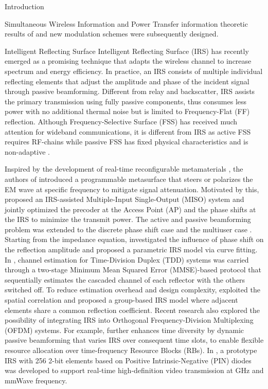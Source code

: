 \documentclass[journal]{IEEEtran}
\begin{document}
\begin{section}{Introduction}
\begin{subsection}{Simultaneous Wireless Information and Power Transfer}
information theoretic results of \cite{Varasteh2020} and new modulation schemes were subsequently designed.
		\end{subsection}


		\begin{subsection}{Intelligent Reflecting Surface}
			Intelligent Reflecting Surface (IRS) has recently emerged as a promising technique that adapts the wireless channel to increase spectrum and energy efficiency. In practice, an IRS consists of multiple individual reflecting elements that adjust the amplitude and phase of the incident signal through passive beamforming. Different from relay and backscatter, IRS assists the primary transmission using fully passive components, thus consumes less power with no additional thermal noise but is limited to Frequency-Flat (FF) reflection. Although Frequency-Selective Surface (FSS) has received much attention for wideband communications, it is different from IRS as active FSS requires RF-chains \cite{Kim2006} while passive FSS has fixed physical characteristics and is non-adaptive \cite{Anwar2018}.

			Inspired by the development of real-time reconfigurable metamaterials \cite{Cui2014}, the authors of \cite{Liaskos2018} introduced a programmable metasurface that steers or polarizes the EM wave at specific frequency to mitigate signal attenuation. Motivated by this, \cite{Wu2018} proposed an IRS-assisted Multiple-Input Single-Output (MISO) system and jointly optimized the precoder at the Access Point (AP) and the phase shifts at the IRS to minimize the transmit power. The active and passive beamforming problem was extended to the discrete phase shift case \cite{Wu2019a} and the multiuser case \cite{Wu2019}. Starting from the impedance equation, \cite{Abeywickrama2019} investigated the influence of phase shift on the reflection amplitude and proposed a parametric IRS model via curve fitting. In \cite{Nadeem2019}, channel estimation for Time-Division Duplex (TDD) systems was carried through a two-stage Minimum Mean Squared Error (MMSE)-based protocol that sequentially estimates the cascaded channel of each reflector with the others switched off. To reduce estimation overhead and design complexity, \cite{Yang2019} exploited the spatial correlation and proposed a group-based IRS model where adjacent elements share a common reflection coefficient. Recent research also explored the possibility of integrating IRS into Orthogonal Frequency-Division Multiplexing (OFDM) systems. For example, \cite{Yang2020} further enhances time diversity by dynamic passive beamforming that varies IRS over consequent time slots, to enable flexible resource allocation over time-frequency Resource Blocks (RBs). In \cite{Dai2020}, a prototype IRS with \num{256} \num{2}-bit elements based on Positive Intrinsic-Negative (PIN) diodes was developed to support real-time high-definition video transmission at \si{GHz} and mmWave frequency.
		\end{subsection}



\end{section}
\end{document}
